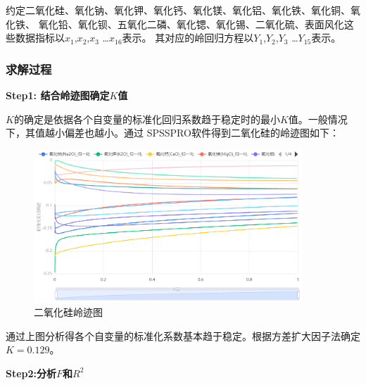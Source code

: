 \documentclass[UTF8]{ctexart}
\begin{document}
                约定二氧化硅、氧化钠、氧化钾、氧化钙、氧化镁、氧化铝、氧化铁、氧化铜、氧化铁、
                氧化铅、氧化钡、五氧化二磷、氧化锶、氧化锡、二氧化硫、表面风化这些数据指标以$x_1$,$x_2$,$x_3$ \dots $x_{16}$表示。
                其对应的岭回归方程以$Y_1$,$Y_2$,$Y_3$ \dots $Y_{15}$表示。

                \subsubsection{求解过程}
                \textbf{Step1: 结合岭迹图确定$K$值}

            $K$的确定是依据各个自变量的标准化回归系数趋于稳定时的最小$K$值。一般情况下，其值越小偏差也越小。通过
                SPSSPRO软件得到二氧化硅的岭迹图如下：
                \begin{figure}[H]\centering
                    \includegraphics[width=0.9\textwidth]{img/二氧化硅岭迹图.png} %
                    \caption{二氧化硅岭迹图} %
                    \label{fig:figure 5} %
                \end{figure}

                通过上图分析得各个自变量的标准化系数基本趋于稳定。根据方差扩大因子法确定$K=0.129$。

                \textbf{Step2:分析$F$和$R^2$}
\end{document}
